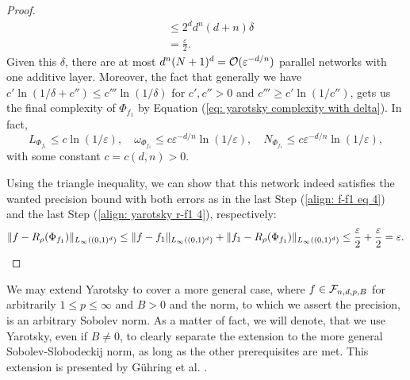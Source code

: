 \begin{proof}
\begin{align}
        &\leq 2^d d^n (d + n) \delta \label{align: yarotsky r-f1 3} \\
        &= \frac{\varepsilon}{2}. \label{align: yarotsky r-f1 4}
    \end{align}
    Given this $\delta$, there are at most $d^n (N + 1)^d = \mathcal{O}(\varepsilon^{-d/n})$ parallel networks 
    with one additive layer. Moreover, the fact that
    generally we have $c'\ln(1 / \delta + c'') \leq c''' \ln(1 / \delta)$ 
    for $c', c'' > 0$ and $c''' \geq c' \ln(1 / c'')$, gets us the final complexity of $\Phi_{f_1}$ by
    Equation (\ref{eq: yarotsky complexity with delta}). In fact,
    \begin{equation*}
        L_{\Phi_{f_1}} \leq c \ln(1 / \varepsilon), \quad \omega_{\Phi_{f_1}} \leq c \varepsilon^{-d/n} \ln(1/\varepsilon),
        \quad N_{\Phi_{f_1}} \leq c \varepsilon^{-d/n} \ln(1/\varepsilon),
    \end{equation*}
    with some constant $c = c(d, n) > 0$.

    Using the triangle inequality, we can show that this network indeed satisfies the wanted precision bound with
    both errors as in the last Step (\ref{align: f-f1 eq 4}) and the last Step (\ref{align: yarotsky r-f1 4}), respectively:
    \begin{equation*}
        \lVert f - R_\rho(\Phi_{f_1}) \rVert_{L_\infty((0,1)^d)} \leq \lVert f - f_1 \rVert_{L_\infty((0,1)^d)} + \lVert f_1 - R_\rho(\Phi_{f_1}) \rVert_{L_\infty((0,1)^d)}
        \leq \frac{\varepsilon}{2} + \frac{\varepsilon}{2} = \varepsilon.
    \end{equation*}
\end{proof}

We may extend Yarotsky to cover a more general case, where $f \in \mathcal{F}_{n, d, p, B}$ for arbitrarily
$1 \leq p \leq \infty$ and $B > 0$ and the norm, to which we assert the precision, is an arbitrary Sobolev norm.
As a matter of fact, we will denote, that we use Yarotsky, even if $B \neq 0$, to clearly separate the
extension to the more general Sobolev-Slobodeckij norm, as long as the other prerequisites are met.
This extension is presented by Gühring et al. \cite{gühring2019nn}.

